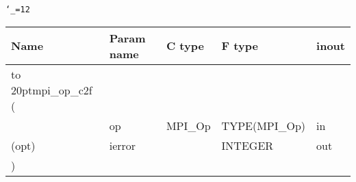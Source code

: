\begingroup\tt\catcode`\_=12
\begin{tabular}{lllll}
\toprule
\textrm{Name}&\textrm{Param name}&\textrm{C type}&\textrm{F type}&\textrm{inout}\\
\midrule
\hbox to 20pt{mpi_op_c2f (\hss} \\
&op&MPI_Op&TYPE(MPI_Op)&in\\
(opt)&ierror&&INTEGER&out\\
)\\
\bottomrule
\end{tabular}
\endgroup

